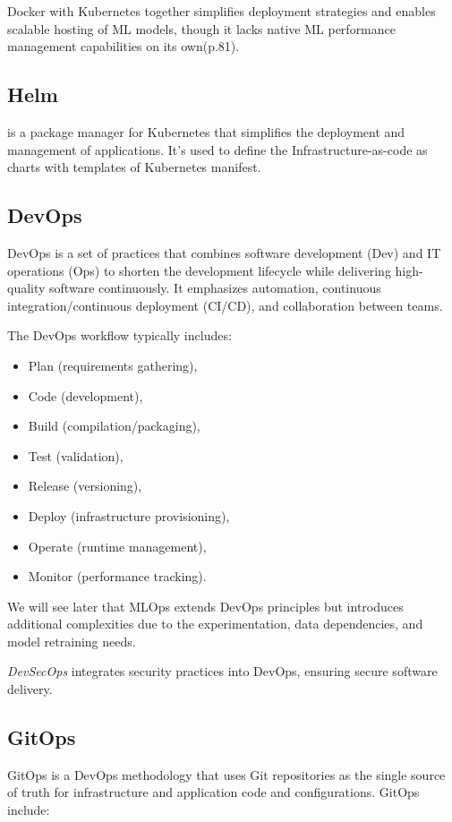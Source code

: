 Docker with Kubernetes together simplifies deployment strategies and enables scalable hosting of ML models,
though it lacks native ML performance management capabilities on its own\cite{treveil2020introducing}(p.81).

\subsection{Helm}\label{subsec:helm}
is a package manager for Kubernetes that simplifies the deployment and management of applications\cite{9792270}.
It's used to define the Infrastructure-as-code as charts with templates of Kubernetes manifest.

\subsection{DevOps}\label{subsec:devops}
DevOps is a set of practices that combines software development (Dev) and IT
operations (Ops) to shorten the development lifecycle while delivering
high-quality software continuously\cite{devops}.
It emphasizes automation, continuous integration/continuous deployment (CI/CD), and collaboration between
teams.

The DevOps workflow typically includes\cite{devops}:

\begin{itemize}
    \item Plan (requirements gathering),
    \item Code (development),
    \item Build (compilation/packaging),
    \item Test (validation),
    \item Release (versioning),
    \item Deploy (infrastructure provisioning),
    \item Operate (runtime management),
    \item Monitor (performance tracking).
\end{itemize}
We will see later that MLOps extends DevOps principles but introduces additional complexities due to the experimentation,
data dependencies, and model retraining needs\cite{10.1145/3533378}.

\textit{DevSecOps} integrates security practices into DevOps, ensuring secure software delivery.

\subsection{GitOps}\label{subsec:gitops}
GitOps\cite{gitops} is a DevOps methodology that uses Git repositories as the single source of truth for infrastructure and application code and configurations\cite{inproceedings}.
GitOps include\cite{gitops}:

